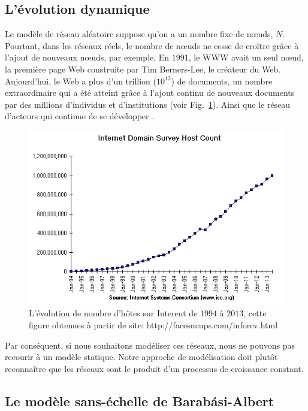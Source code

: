 \subsection{L'évolution dynamique}
Le modèle de réseau aléatoire suppose qu'on a un nombre fixe de nœuds, $N$. Pourtant, dans les réseaux réels, le nombre de nœuds ne cesse de croître grâce à l'ajout de nouveaux nœuds, par exemple, En $1991$, le WWW avait un seul nœud, la première page Web construite par Tim Berners-Lee, le créateur du Web. Aujourd'hui, le Web a plus d'un trillion ($10^{12}$) de documents, un nombre extraordinaire qui a été atteint grâce à l'ajout continu de nouveaux documents par des millions d'individus et d'institutions (voir Fig.~\ref{hosts}). Ainsi que le réseau d'acteurs qui continue de se développer \cite{Barabasi2015}.
\begin{figure}[h]
	\centering
	\includegraphics[scale=0.5]{./figures/hosts}
	\caption{L'évolution de nombre d'hôtes sur Interent de $1994$ à $2013$, cette figure  obtenues à partir de site: http://facesncups.com/inforev.html}
	\label{hosts}
\end{figure}
Par conséquent, si nous souhaitons modéliser ces réseaux, nous ne pouvons pas recourir à un modèle statique. Notre approche de modélisation doit plutôt reconnaître que les réseaux sont le produit d'un processus de croissance constant.
\subsection{Le modèle sans-échelle de Barabási-Albert}

